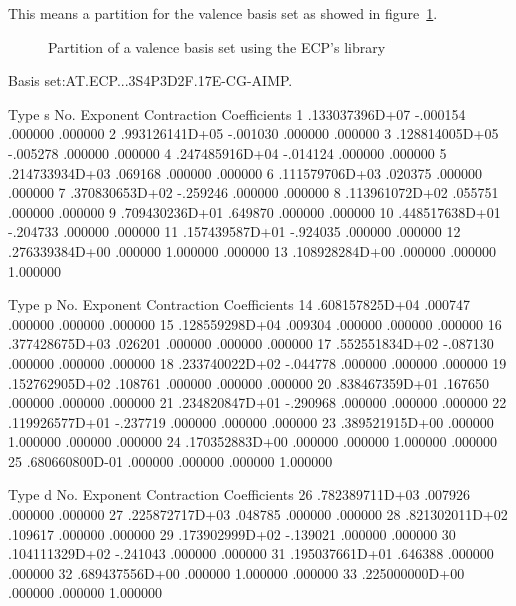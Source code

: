 This means a partition for the valence basis set as showed in 
figure~\ref{fig:valbas_ecp}.

\begin{figure}[h]
\caption{Partition of a valence basis set using the ECP's library}
\label{fig:valbas_ecp}
\end{figure}
\begin{sourcelisting}
 Basis set:AT.ECP...3S4P3D2F.17E-CG-AIMP.

                  Type
                   s
           No.      Exponent    Contraction Coefficients
            1   .133037396D+07  -.000154   .000000   .000000
            2   .993126141D+05  -.001030   .000000   .000000
            3   .128814005D+05  -.005278   .000000   .000000
            4   .247485916D+04  -.014124   .000000   .000000
            5   .214733934D+03   .069168   .000000   .000000
            6   .111579706D+03   .020375   .000000   .000000
            7   .370830653D+02  -.259246   .000000   .000000
            8   .113961072D+02   .055751   .000000   .000000
            9   .709430236D+01   .649870   .000000   .000000
           10   .448517638D+01  -.204733   .000000   .000000
           11   .157439587D+01  -.924035   .000000   .000000
           12   .276339384D+00   .000000  1.000000   .000000
           13   .108928284D+00   .000000   .000000  1.000000

                  Type
                   p
           No.      Exponent    Contraction Coefficients
           14   .608157825D+04   .000747   .000000   .000000   .000000
           15   .128559298D+04   .009304   .000000   .000000   .000000
           16   .377428675D+03   .026201   .000000   .000000   .000000
           17   .552551834D+02  -.087130   .000000   .000000   .000000
           18   .233740022D+02  -.044778   .000000   .000000   .000000
           19   .152762905D+02   .108761   .000000   .000000   .000000
           20   .838467359D+01   .167650   .000000   .000000   .000000
           21   .234820847D+01  -.290968   .000000   .000000   .000000
           22   .119926577D+01  -.237719   .000000   .000000   .000000
           23   .389521915D+00   .000000  1.000000   .000000   .000000
           24   .170352883D+00   .000000   .000000  1.000000   .000000
           25   .680660800D-01   .000000   .000000   .000000  1.000000

                  Type
                   d
           No.      Exponent    Contraction Coefficients
           26   .782389711D+03   .007926   .000000   .000000
           27   .225872717D+03   .048785   .000000   .000000
           28   .821302011D+02   .109617   .000000   .000000
           29   .173902999D+02  -.139021   .000000   .000000
           30   .104111329D+02  -.241043   .000000   .000000
           31   .195037661D+01   .646388   .000000   .000000
           32   .689437556D+00   .000000  1.000000   .000000
           33   .225000000D+00   .000000   .000000  1.000000


\end{sourcelisting}
